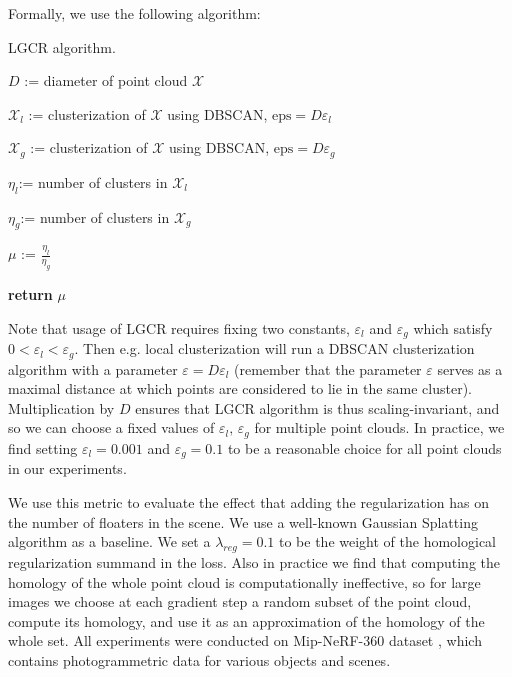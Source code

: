 Formally, we use the following algorithm:

\begin{algorithm}[h!]
    
\caption{LGCR algorithm.}
\SetAlgoLined
{}

$D$ := diameter of point cloud $\mathcal{X}$

$\mathcal{X}_l$ := clusterization of $\mathcal{X}$ using DBSCAN, $\text{eps} = D{\varepsilon_l}$

$\mathcal{X}_g$ := clusterization of $\mathcal{X}$ using DBSCAN, $\text{eps} = D{\varepsilon_g}$

$\eta_l$:= number of clusters in $\mathcal{X}_l$

$\eta_g$:= number of clusters in $\mathcal{X}_g$

$\mu$ := $\frac{\eta_l}{\eta_g}$

\textbf{return} $\mu$
\label{algo:lgcr}
\end{algorithm}

Note that usage of LGCR requires fixing two constants, $\varepsilon_l$ and $\varepsilon_g$ which satisfy $0 < \varepsilon_l < \varepsilon_g$. Then e.g. local clusterization will run a DBSCAN clusterization algorithm with a parameter $\varepsilon = D{\varepsilon_l}$ (remember that the parameter $\varepsilon$ serves as a maximal distance at which points are considered to lie in the same cluster). Multiplication by $D$ ensures that LGCR algorithm is thus scaling-invariant, and so we can choose a fixed values of $\varepsilon_l, \, \varepsilon_g$ for multiple point clouds. In practice, we find setting $\varepsilon_l = 0.001$ and $\varepsilon_g = 0.1$ to be a reasonable choice for all point clouds in our experiments.

We use this metric to evaluate the effect that adding the regularization has on the number of floaters in the scene. We use a well-known Gaussian Splatting algorithm \cite{kerbl20233d} as a baseline. We set a $\lambda_{reg} = 0.1$ to be the weight of the homological regularization summand in the loss. Also in practice we find that computing the homology of the whole point cloud is computationally ineffective, so for large images we choose at each gradient step a random subset of the point cloud, compute its homology, and use it as an approximation of the homology of the whole set. All experiments were conducted on Mip-NeRF-360 dataset \cite{barron2022mipnerf}, which contains photogrammetric data for various objects and scenes.


